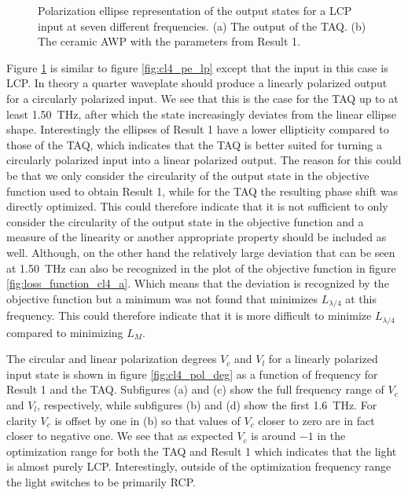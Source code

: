 \begin{figure}[H]
\begin{subfigure}[b]{.5\linewidth}
    \end{subfigure}
    \caption{Polarization ellipse representation of the output states for a LCP input at seven different frequencies. (a) The output of the TAQ. (b) The ceramic AWP with the parameters from Result 1.}
    \label{fig:cl4_pe_cp}
\end{figure}

Figure \ref{fig:cl4_pe_cp} is similar to figure \ref{fig:cl4_pe_lp} except that the input in this case is LCP. In theory a quarter waveplate should produce a linearly polarized output for a circularly polarized input. We see that this is the case for the TAQ up to at least \SI{1.50}{\tera \hertz}, after which the state increasingly deviates from the linear ellipse shape. Interestingly the ellipses of Result 1 have a lower ellipticity compared to those of the TAQ, which indicates that the TAQ is better suited for turning a circularly polarized input into a linear polarized output. The reason for this could be that we only consider the circularity of the output state in the objective function used to obtain Result 1, while for the TAQ the resulting phase shift was directly optimized. This could therefore indicate that it is not sufficient to only consider the circularity of the output state in the objective function and a measure of the linearity or another appropriate property should be included as well. Although, on the other hand the relatively large deviation that can be seen at \SI{1.50}{\tera \hertz} can also be recognized in the plot of the objective function in figure \ref{fig:loss_function_cl4_a}. Which means that the deviation is recognized by the objective function but a minimum was not found that minimizes $L_{\lambda/4}$ at this frequency. This could therefore indicate that it is more difficult to minimize $L_{\lambda/4}$ compared to minimizing $L_M$.

The circular and linear polarization degrees $V_c$ and $V_l$ for a linearly polarized input state is shown in figure \ref{fig:cl4_pol_deg} as a function of frequency for Result 1 and the TAQ. Subfigures (a) and (c) show the full frequency range of $V_c$ and $V_l$, respectively, while subfigures (b) and (d) show the first \SI{1.6}{\tera \hertz}. For clarity $V_c$ is offset by one in (b) so that values of $V_c$ closer to zero are in fact closer to negative one. We see that as expected $V_c$ is around $-1$ in the optimization range for both the TAQ and Result 1 which indicates that the light is almost purely LCP. Interestingly, outside of the optimization frequency range the light switches to be primarily RCP. 

